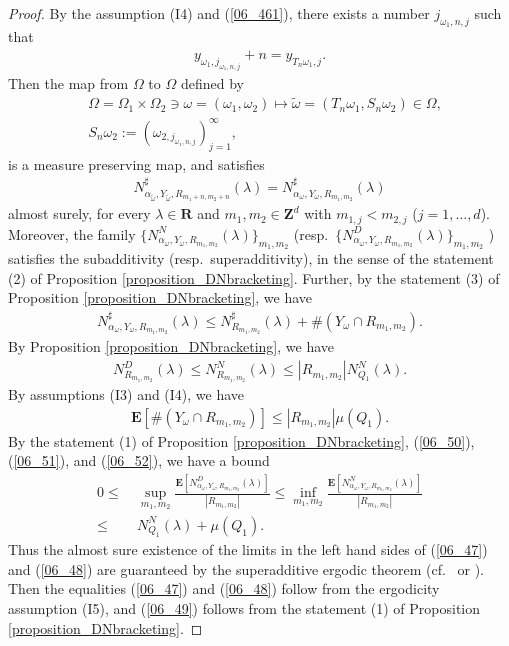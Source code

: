 \documentclass[12pt,a4paper]{article}
\begin{document}
\begin{proof}
By the assumption (I4) and (\ref{06_461}),
there exists a number $j_{\omega_1,n,j}$ such that
\begin{align*}
 y_{\omega_1,j_{\omega_1,n,j}}+n
=
y_{T_n\omega_1,j}.
\end{align*}
Then the map from $\Omega$ to $\Omega$ defined by
\begin{align*}
&
\Omega=\Omega_1\times \Omega_2
\ni \omega=(\omega_1,\omega_2)
\mapsto
\widetilde{\omega}=(T_n \omega_1,S_n \omega_2)\in \Omega,\\
&S_n\omega_2 :=(\omega_{2,j_{\omega_1,n,j}})_{j=1}^\infty,
\end{align*}
is a measure preserving map, and satisfies
\begin{align*}
 N^\sharp_{\alpha_{\widetilde{\omega}},Y_{\widetilde{\omega}},R_{m_1+n,m_2+n}}
(\lambda)
=
 N^\sharp_{\alpha_{\omega},Y_{\omega},R_{m_1,m_2} }(\lambda)
\end{align*}
almost surely, for every $\lambda \in \mathbf{R}$
and $m_1,m_2\in \mathbf{Z}^d$ with $m_{1,j}<m_{2,j}$ ($j=1,\ldots,d$).
Moreover, 
the family
$\{N^N_{\alpha_\omega,Y_\omega,R_{m_1,m_2}}(\lambda)\}_{m_1,m_2}$ 
(resp.\ $\{N^D_{\alpha_\omega,Y_\omega,R_{m_1,m_2}}(\lambda)\}_{m_1,m_2}$ 
) satisfies the subadditivity (resp.\ superadditivity),
in the sense of the statement (2) of Proposition \ref{proposition_DNbracketing}.
Further, by the statement (3) of
Proposition \ref{proposition_DNbracketing},
we have
\begin{align}
\label{06_50}
 N^\sharp_{\alpha_\omega,Y_\omega,R_{m_1,m_2}}(\lambda)
\leq  N^\sharp_{R_{m_1,m_2}}(\lambda)+\#(Y_\omega\cap R_{m_1,m_2}).
\end{align}
By Proposition \ref{proposition_DNbracketing},
we have
\begin{align}
\label{06_51}
 N^D_{R_{m_1,m_2}}(\lambda)
\leq
 N^N_{R_{m_1,m_2}}(\lambda)
\leq |R_{m_1,m_2}|
 N^N_{Q_1}(\lambda).
\end{align}
By assumptions (I3) and (I4), we have
\begin{align}
\label{06_52}
 \mathbf{E}[\#(Y_\omega\cap R_{m_1,m_2})]
\leq |R_{m_1,m_2}|\mu(Q_1).
\end{align}
By the statement (1) of Proposition \ref{proposition_DNbracketing},
(\ref{06_50}), (\ref{06_51}), and (\ref{06_52}), we have a bound
\begin{align*}
 0\leq&\  
\sup_{m_1,m_2} \frac{\mathbf{E}[N^D_{\alpha_\omega,Y_\omega,R_{m_1,m_2}}(\lambda)]}{|R_{m_1,m_2}|}
\leq 
\inf_{m_1,m_2} \frac{\mathbf{E}[N^N_{\alpha_\omega,Y_\omega,R_{m_1,m_2}}(\lambda)]}{|R_{m_1,m_2}|}\\
\leq&\ 
 N^N_{Q_1}(\lambda)
+
\mu(Q_1).
\end{align*}
Thus the almost sure existence of the limits in the left hand sides
of (\ref{06_47}) and (\ref{06_48})
are guaranteed by
the superadditive ergodic theorem
(cf.\ \cite{Ak-Kr} or \cite{Ca-La}).
Then the equalities 
(\ref{06_47}) and (\ref{06_48}) follow from 
the ergodicity assumption (I5),
and (\ref{06_49}) follows from 
the statement (1) of Proposition \ref{proposition_DNbracketing}.
\end{proof}
\end{document}
